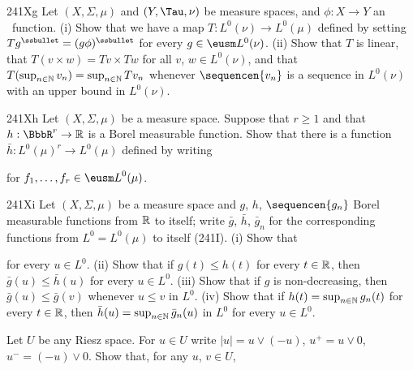 {\spheader 241Xg Let $(X,\Sigma,\mu)$ and $(Y,\Tau,\nu)$ be measure
spaces, and $\phi:X\to Y$ an \imp\ function.   (i) Show that we have a
map $T:L^0(\nu)\to L^0(\mu)$ defined by setting
$Tg^{\ssbullet}=(g\phi)^{\ssbullet}$ for every $g\in\eusm L^0(\nu)$.
(ii) Show that
$T$ is linear, that $T(v\times w)=Tv\times Tw$ for all $v$,
$w\in L^0(\nu)$, and that $T(\sup_{n\in\Bbb N}v_n)=\sup_{n\in\Bbb N}Tv_n$
whenever $\sequencen{v_n}$ is a sequence in $L^0(\nu)$ with an upper
bound in $L^0(\nu)$.

\sqheader 241Xh Let $(X,\Sigma,\mu)$ be a measure space.
Suppose that $r\ge 1$ and that $h:\BbbR^r\to\Bbb R$ is a Borel
measurable function.   Show that there is a function
$\bar h:L^0(\mu)^r\to L^0(\mu)$ defined by writing


\noindent for $f_1,\ldots,f_r\in{\eusm L}^0(\mu)$.

\spheader 241Xi Let $(X,\Sigma,\mu)$ be a measure space and $g$, $h$,
$\sequencen{g_n}$ Borel measurable functions from $\Bbb R$ to itself;
write $\bar g$, $\bar h$, $\bar g_n$ for the corresponding functions
from $L^0=L^0(\mu)$ to itself (241I).   (i) Show that


\noindent for every $u\in L^0$.   (ii) Show that if $g(t)\le h(t)$ for
every $t\in\Bbb R$, then $\bar g(u)\le\bar h(u)$ for every $u\in L^0$.
(iii) Show that if $g$ is non-decreasing, then $\bar g(u)\le\bar g(v)$
whenever $u\le v$ in $L^0$.   (iv) Show that if $h(t)=\sup_{n\in\Bbb
N}g_n(t)$ for every $t\in\Bbb R$, then $\bar h(u)=\sup_{n\in\Bbb N}\bar
g_n(u)$ in $L^0$ for every $u\in L^0$.

Let $U$ be any Riesz space.   For $u\in U$ write
$|u|=u\vee(-u)$, $u^+=u\vee 0$, $u^-=(-u)\vee 0$.   Show that, for any
$u$, $v\in U$,





}
